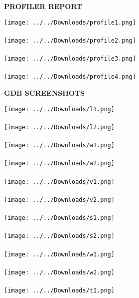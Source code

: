 \documentclass{report}
\begin{document}
\pagebreak
\begin{center}
\textbf{PROFILER REPORT}\\
\vspace{4mm}
\end{center}
\texttt{[image: ../../Downloads/profile1.png]} \\\\
\texttt{[image: ../../Downloads/profile2.png]} \\\\
\texttt{[image: ../../Downloads/profile3.png]} \\\\
\texttt{[image: ../../Downloads/profile4.png]} 
\pagebreak
\begin{center}
\textbf{GDB SCREENSHOTS}\\
\vspace{4mm}
\end{center}
\texttt{[image: ../../Downloads/l1.png]} \\\\
\texttt{[image: ../../Downloads/l2.png]} \\\\
\texttt{[image: ../../Downloads/a1.png]} \\\\
\texttt{[image: ../../Downloads/a2.png]} \\\\
\texttt{[image: ../../Downloads/v1.png]} \\\\
\texttt{[image: ../../Downloads/v2.png]} \\\\
\texttt{[image: ../../Downloads/s1.png]} \\\\
\texttt{[image: ../../Downloads/s2.png]} \\\\
\texttt{[image: ../../Downloads/w1.png]} \\\\
\texttt{[image: ../../Downloads/w2.png]} \\\\
\texttt{[image: ../../Downloads/t1.png]} \\\\
\end{document}
